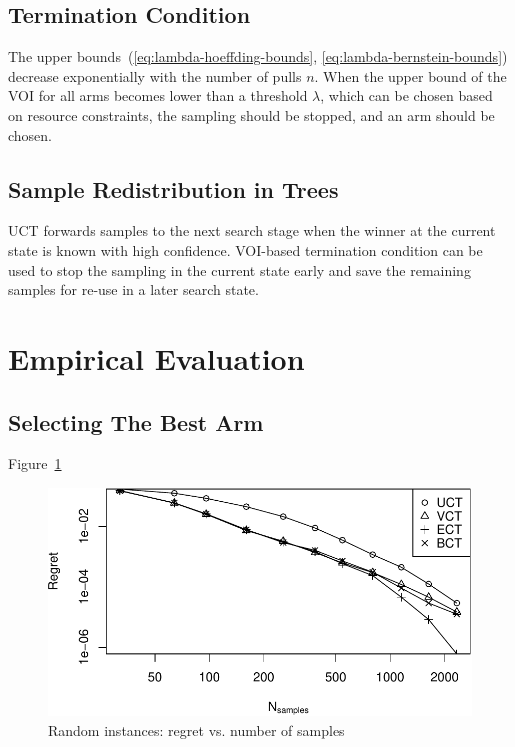 \documentclass{article}
\begin{document}
\subsection{Termination Condition}

The upper bounds~(\ref{eq:lambda-hoeffding-bounds}, \ref{eq:lambda-bernstein-bounds}) decrease exponentially with the
number of pulls $n$. When the upper bound of the VOI for all arms
becomes lower than a threshold $\lambda$, which can be chosen based on
resource constraints, the sampling should be stopped, and an arm should
be chosen.

\subsection{Sample Redistribution in Trees}

UCT forwards samples to the next search stage when the winner at the
current state is known with high confidence. VOI-based termination
condition can be used to stop the sampling in the current state early
and save the remaining samples for re-use in a later search state.

\section{Empirical Evaluation}

\subsection{Selecting The Best Arm}

Figure~\ref{fig:random-instances}

\begin{figure}[h]
\centering
\includegraphics[scale=0.8]{flat.pdf}
\caption{Random instances: regret vs. number of samples}
\label{fig:random-instances}
\end{figure}
\end{document}
